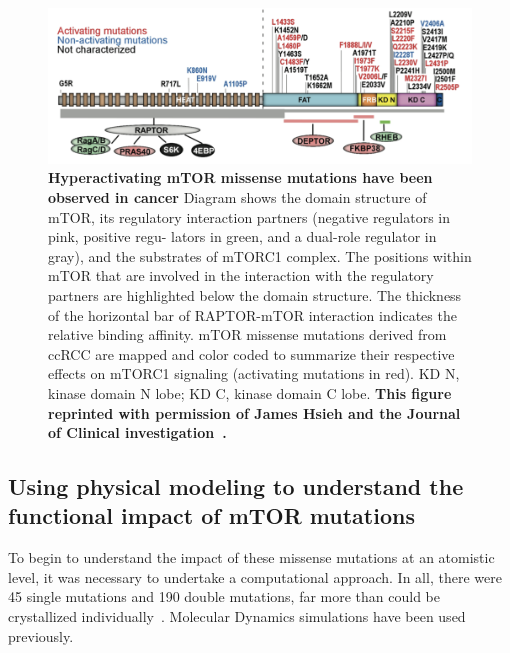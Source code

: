\documentclass[phd,tocprelim]{cornell}
\begin{document}
\begin{landscape}
	\begin{figure}[p]
		\centering
		\includegraphics[width=1.0\linewidth]{figures/mtor-fig3.png}
		\caption[Hyperactivating mTOR missense mutations have been observed in cancer]{
			{\bf Hyperactivating mTOR missense mutations have been observed in cancer}
			Diagram shows the domain structure of mTOR, its regulatory interaction partners (negative regulators in pink, positive regu- lators in green, and a dual-role regulator in gray), and the substrates of mTORC1 complex. The positions within mTOR that are involved in the interaction with the regulatory partners are highlighted below the domain structure. The thickness of the horizontal bar of RAPTOR-mTOR interaction indicates the relative binding affinity. mTOR missense mutations derived from ccRCC are mapped and color coded
			to summarize their respective effects on mTORC1 signaling (activating mutations in red). KD N, kinase domain N lobe; KD C, kinase domain C lobe. \bf{This figure reprinted with permission of James Hsieh and the Journal of Clinical investigation~\citep{Xu:2016fw}.}
		}
		\label{fig:mtor-figure3}
	\end{figure}
\end{landscape}

\subsection{Using physical modeling to understand the functional impact of mTOR mutations}
To begin to understand the impact of these missense mutations at an atomistic level, it was necessary to undertake a computational approach. In all, there were 45 single mutations and 190 double mutations, far more than could be crystallized individually~\citep{Xu:2016fw}. Molecular Dynamics simulations have been used previously. 
\end{document}
